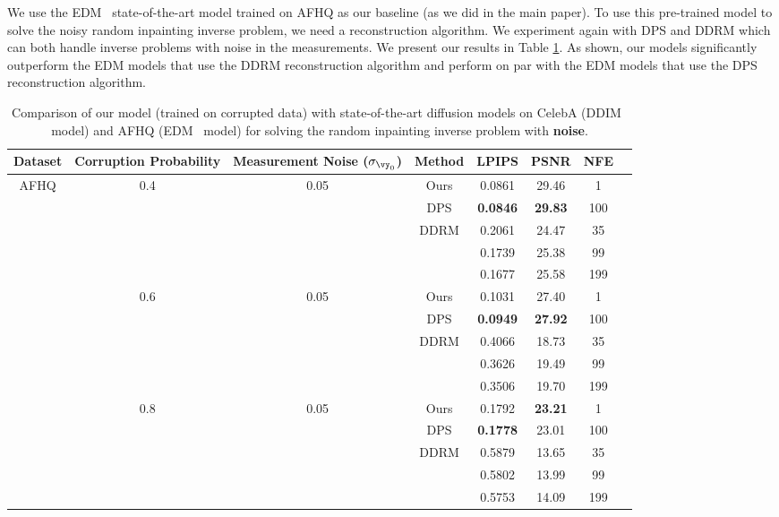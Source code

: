 \documentclass{article}
\begin{document}
We use the EDM~\citep{karras2022elucidating} state-of-the-art model trained on AFHQ as our baseline (as we did in the main paper). To use this pre-trained model to solve the noisy random inpainting inverse problem, we need a reconstruction algorithm. We experiment again with DPS and DDRM which can both handle inverse problems with noise in the measurements. We present our results in Table \ref{table:restoration-measurement-noise}. As shown, our models significantly outperform the EDM models that use the DDRM reconstruction algorithm and perform on par with the EDM models that use the DPS reconstruction algorithm.


\begin{table}[!htp]
\centering
\small{
\begin{tabular}{@{}cccccccc@{}}
\toprule
\textbf{Dataset} & \textbf{Corruption Probability} & \textbf{Measurement Noise ($\sigma_{\vy_0}$)} & \textbf{Method} & \textbf{LPIPS} & \textbf{PSNR} & \textbf{NFE} \\ 
\midrule
AFHQ 
& \multirow{5}{*}{0.4} & \multirow{5}{*}{0.05} & Ours & 0.0861 & 29.46 & 1\\ 
&  & & DPS & \textbf{0.0846} & \textbf{29.83} & 100\\
&  & & \multirow{3}{*}{DDRM} & 0.2061 & 24.47 & 35 \\
&  &  & & 0.1739 & 25.38 & 99 \\
&  &  & & 0.1677 & 25.58 & 199 \\
\hline
& \multirow{5}{*}{0.6} & \multirow{5}{*}{0.05} & Ours & 0.1031 & 27.40 & 1\\ 
&  & & DPS & \textbf{0.0949} & \textbf{27.92} & 100\\ 
&  & & \multirow{3}{*}{DDRM} & 0.4066 & 18.73 & 35\\ 
&  &  & & 0.3626 & 19.49 & 99\\ 
&  &  & & 0.3506 & 19.70 & 199\\ 
\hline 
& \multirow{5}{*}{0.8} & \multirow{5}{*}{0.05} & Ours & 0.1792 & \textbf{23.21} & 1\\ 
&  & & DPS & \textbf{0.1778} & 23.01 & 100\\  
&  & & \multirow{3}{*}{DDRM} & 0.5879  & 13.65 & 35 \\
&  &  & & 0.5802 & 13.99  & 99\\
&  &  & & 0.5753 & 14.09 & 199\\
\end{tabular}}
\caption{\small Comparison of our model (trained on corrupted data) with state-of-the-art diffusion models on CelebA (DDIM~\citep{ddim} model) and AFHQ (EDM~\citep{karras2022elucidating} model) for solving the random inpainting inverse problem with \textbf{noise}.}
\label{table:restoration-measurement-noise}
\end{table}
\end{document}
